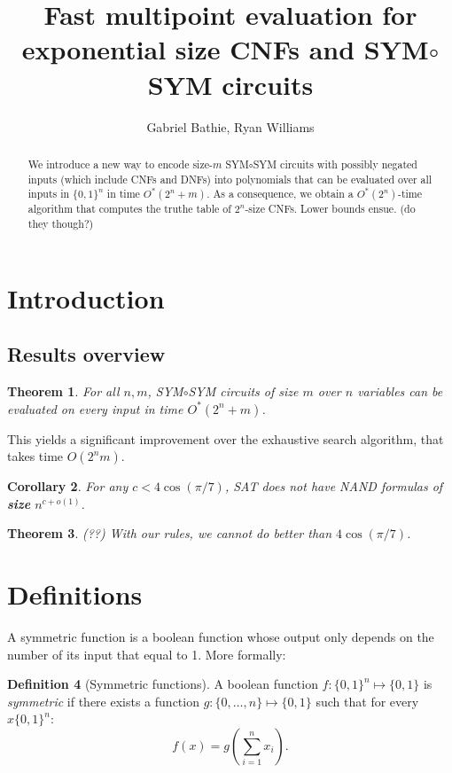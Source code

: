 \documentclass[a4paper, 11pt]{article}
\title{Fast multipoint evaluation for exponential size CNFs and SYM$\circ$SYM circuits}
\author{Gabriel Bathie, Ryan Williams}
\theoremstyle{plain}
\newtheorem{theorem}{Theorem}[section] %
\newtheorem{corollary}[theorem]{Corollary}
\theoremstyle{definition}
\newtheorem{definition}[theorem]{Definition}
\theoremstyle{remark}
\newcommand{\bit}{\{0,1\}}%
\newcommand{\SAT}{\textsf{SAT}}%
\newcommand{\NAND}{\textsf{NAND}}%
\newcommand{\ssym}{\textsf{SYM$\circ$SYM}}%
\begin{document}
\maketitle

\begin{abstract}
We introduce a new way to encode size-$m$ \ssym{} circuits with possibly negated inputs
(which include CNFs and DNFs)
into polynomials that can be evaluated over all inputs in $\bit^n$ in time $O^*(2^n + m)$.
As a consequence, we obtain a $O^*(2^n)$-time algorithm that computes the
truthe table of $2^n$-size CNFs.
Lower bounds ensue. (do they though?)
\end{abstract}


\section{Introduction}

\subsection{Results overview}

\begin{theorem}
	For all $n, m$, \ssym{} circuits of size $m$ over $n$ variables can be evaluated
	on every input in time $O^*(2^n + m)$.
\end{theorem}

This yields a significant improvement over the exhaustive search algorithm, that takes time $O(2^nm)$.

\begin{corollary}
	For any $c < 4 \cos(\pi/7)$, \SAT{} does not have \NAND{} formulas of \textbf{size} $n^{c + o(1)}$.
\end{corollary}

\begin{theorem} (??)
	With our rules, we cannot do better than $4 \cos(\pi/7)$.
\end{theorem}

\section{Definitions}

A symmetric function is a boolean function whose output only depends on the number of 
its input that equal to 1.
More formally:
\begin{definition}[Symmetric functions]
	A boolean function $f: \bit^n \mapsto \bit$ is \textit{symmetric} if there exists a function
	$g: \{0,\ldots, n\} \mapsto \bit$ such that for every $x\bit^n$:
	\[f(x) = g(\sum_{i=1}^n x_i).\]
\end{definition}
\end{document}
